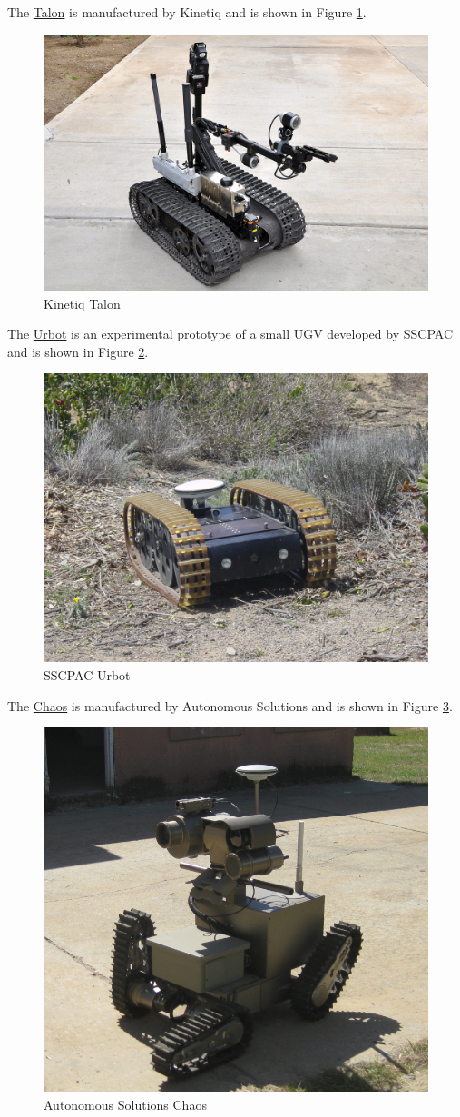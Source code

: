 The \href{http://www.foster-miller.com/lemming.htm}{Talon} is manufactured by Kinetiq and is shown in Figure \ref{fig:talon}.

\begin{figure}[ht!]
	\centering
	\includegraphics[width=.3\textwidth]{images/talonRetrotraverse}
	\caption{Kinetiq Talon}
	\label{fig:talon}
\end{figure}

The \href{http://www.spawar.navy.mil/robots/land/mprs/mprs.html}{Urbot} is an experimental prototype of a small UGV developed by SSCPAC and is shown in Figure \ref{fig:urbot}.

\begin{figure}[ht!]
	\centering
	\includegraphics[width=.3\textwidth]{images/urbotWithGps}
	\caption{SSCPAC Urbot}
	\label{fig:urbot}
\end{figure}

The \href{http://www.autonomoussolutions.com/products/chaos.php}{Chaos} is manufactured by Autonomous Solutions and is shown in Figure \ref{fig:chaos}.

\begin{figure}[ht!]
	\centering
	\includegraphics[width=.3\textwidth]{images/chaos}
	\caption{Autonomous Solutions Chaos}
	\label{fig:chaos}
\end{figure}

